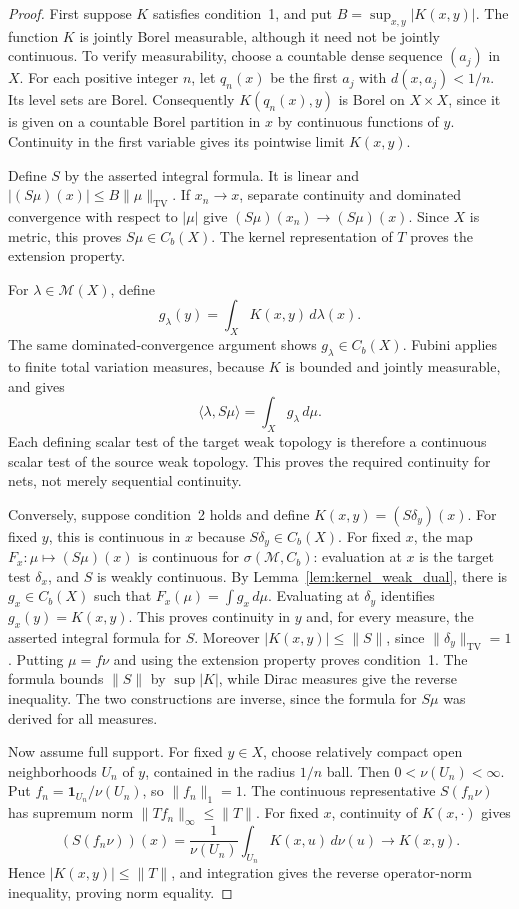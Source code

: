 \begin{proof}
First suppose $K$ satisfies condition~1, and put
$B=\sup_{x,y}|K(x,y)|$. The function $K$ is jointly Borel measurable,
although it need not be jointly continuous. To verify measurability,
choose a countable dense sequence $(a_j)$ in $X$. For each positive
integer $n$, let $q_n(x)$ be the first $a_j$ with
$d(x,a_j)<1/n$. Its level sets are Borel. Consequently
$K(q_n(x),y)$ is Borel on $X\times X$, since it is given on a
countable Borel partition in $x$ by continuous functions of $y$.
Continuity in the first variable gives its pointwise limit $K(x,y)$.

Define $S$ by the asserted integral formula. It is linear and
$|(S\mu)(x)|\le B\|\mu\|_{\mathrm{TV}}$. If $x_n\to x$,
separate continuity and dominated convergence with respect to $|\mu|$
give $(S\mu)(x_n)\to(S\mu)(x)$. Since $X$ is metric, this proves
$S\mu\in C_b(X)$. The kernel representation of $T$ proves the
extension property.

For $\lambda\in\mathcal M(X)$, define
\[
g_\lambda(y)=\int_X K(x,y)\,d\lambda(x).
\]
The same dominated-convergence argument shows $g_\lambda\in C_b(X)$.
Fubini applies to finite total variation measures, because $K$ is
bounded and jointly measurable, and gives
\[
\langle\lambda,S\mu\rangle
=\int_X g_\lambda\,d\mu.
\]
Each defining scalar test of the target weak topology is therefore
a continuous scalar test of the source weak topology. This proves
the required continuity for nets, not merely sequential continuity.

Conversely, suppose condition~2 holds and define
$K(x,y)=(S\delta_y)(x)$. For fixed $y$, this is continuous in $x$
because $S\delta_y\in C_b(X)$. For fixed $x$, the map
$F_x:\mu\mapsto(S\mu)(x)$ is continuous for
$\sigma(\mathcal M,C_b)$: evaluation at $x$ is the target test
$\delta_x$, and $S$ is weakly continuous. By
Lemma~\ref{lem:kernel_weak_dual}, there is $g_x\in C_b(X)$ such that
$F_x(\mu)=\int g_x\,d\mu$. Evaluating at $\delta_y$ identifies
$g_x(y)=K(x,y)$. This proves continuity in $y$ and, for every measure,
the asserted integral formula for $S$. Moreover
$|K(x,y)|\le\|S\|$, since $\|\delta_y\|_{\mathrm{TV}}=1$.
Putting $\mu=f\nu$ and using the extension property proves condition~1.
The formula bounds $\|S\|$ by $\sup|K|$, while Dirac measures give
the reverse inequality. The two constructions are inverse, since
the formula for $S\mu$ was derived for all measures.

Now assume full support. For fixed $y\in X$, choose relatively
compact open neighborhoods $U_n$ of $y$, contained in the radius
$1/n$ ball. Then $0<\nu(U_n)<\infty$. Put
$f_n=\mathbf1_{U_n}/\nu(U_n)$, so $\|f_n\|_1=1$.
The continuous representative $S(f_n\nu)$ has supremum norm
$\|Tf_n\|_\infty\le\|T\|$. For fixed $x$, continuity of $K(x,\cdot)$
gives
\[
(S(f_n\nu))(x)=\frac1{\nu(U_n)}\int_{U_n}K(x,u)\,d\nu(u)
\longrightarrow K(x,y).
\]
Hence $|K(x,y)|\le\|T\|$, and integration gives the reverse
operator-norm inequality, proving norm equality.


\end{proof}
